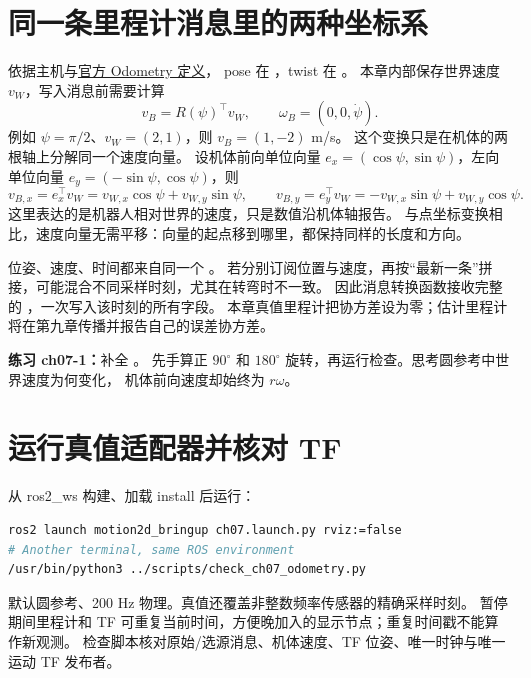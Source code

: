 \section{同一条里程计消息里的两种坐标系}
依据主机与\href{https://github.com/ros2/common_interfaces/blob/rolling/nav_msgs/msg/Odometry.msg}{官方 Odometry 定义}，
pose 在 ，twist 在 。
本章内部保存世界速度 $v_W$，写入消息前需要计算
\begin{equation}
v_B=R(\psi)^\top v_W,\qquad \omega_B=(0,0,\dot\psi).
\end{equation}
例如 $\psi=\pi/2$、$v_W=(2,1)$，则 $v_B=(1,-2)$ m/s。
这个变换只是在机体的两根轴上分解同一个速度向量。
设机体前向单位向量 $e_x=(\cos\psi,\sin\psi)$，左向单位向量
$e_y=(-\sin\psi,\cos\psi)$，则
\[
v_{B,x}=e_x^\top v_W=v_{W,x}\cos\psi+v_{W,y}\sin\psi,\qquad
v_{B,y}=e_y^\top v_W=-v_{W,x}\sin\psi+v_{W,y}\cos\psi.
\]
这里表达的是机器人相对世界的速度，只是数值沿机体轴报告。
与点坐标变换相比，速度向量无需平移：向量的起点移到哪里，都保持同样的长度和方向。

\par\noindent\begin{minipage}{\linewidth}

\end{minipage}\par

位姿、速度、时间都来自同一个 。
若分别订阅位置与速度，再按“最新一条”拼接，可能混合不同采样时刻，尤其在转弯时不一致。
因此消息转换函数接收完整的 ，一次写入该时刻的所有字段。
本章真值里程计把协方差设为零；估计里程计将在第九章传播并报告自己的误差协方差。

\textbf{练习 ch07-1：}补全 。
先手算正 $90^\circ$ 和 $180^\circ$ 旋转，再运行检查。思考圆参考中世界速度为何变化，
机体前向速度却始终为 $r\omega$。

\section{运行真值适配器并核对 TF}
从 ros2\_ws 构建、加载 install 后运行：
\begin{lstlisting}[language=bash,numbers=none]
ros2 launch motion2d_bringup ch07.launch.py rviz:=false
# Another terminal, same ROS environment
/usr/bin/python3 ../scripts/check_ch07_odometry.py
\end{lstlisting}
默认圆参考、200 Hz 物理。真值还覆盖非整数频率传感器的精确采样时刻。
暂停期间里程计和 TF 可重复当前时间，方便晚加入的显示节点；重复时间戳不能算作新观测。
检查脚本核对原始/选源消息、机体速度、TF 位姿、唯一时钟与唯一运动 TF 发布者。

